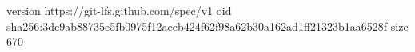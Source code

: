 version https://git-lfs.github.com/spec/v1
oid sha256:3dc9ab88735e5fb0975f12aecb424f62f98a62b30a162ad1ff21323b1aa6528f
size 670
